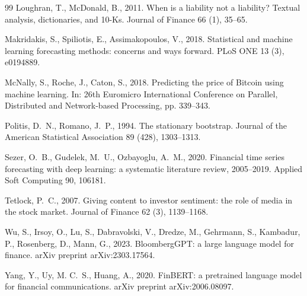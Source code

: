 \documentclass[preprint,12pt,authoryear]{elsarticle}
\begin{document}
\begin{thebibliography}{99}
Loughran, T., McDonald, B., 2011.
When is a liability not a liability? Textual analysis, dictionaries, and 10-Ks.
Journal of Finance 66 (1), 35--65.

Makridakis, S., Spiliotis, E., Assimakopoulos, V., 2018.
Statistical and machine learning forecasting methods: concerns and ways forward.
PLoS ONE 13 (3), e0194889.

McNally, S., Roche, J., Caton, S., 2018.
Predicting the price of Bitcoin using machine learning.
In: 26th Euromicro International Conference on Parallel, Distributed and
Network-based Processing, pp. 339--343.

Politis, D.~N., Romano, J.~P., 1994.
The stationary bootstrap.
Journal of the American Statistical Association 89 (428), 1303--1313.

Sezer, O.~B., Gudelek, M.~U., Ozbayoglu, A.~M., 2020.
Financial time series forecasting with deep learning: a systematic literature
review, 2005--2019.
Applied Soft Computing 90, 106181.

Tetlock, P.~C., 2007.
Giving content to investor sentiment: the role of media in the stock market.
Journal of Finance 62 (3), 1139--1168.

Wu, S., Irsoy, O., Lu, S., Dabravolski, V., Dredze, M., Gehrmann, S., Kambadur,
P., Rosenberg, D., Mann, G., 2023.
BloombergGPT: a large language model for finance.
arXiv preprint arXiv:2303.17564.

Yang, Y., Uy, M. C.~S., Huang, A., 2020.
FinBERT: a pretrained language model for financial communications.
arXiv preprint arXiv:2006.08097.

\end{thebibliography}
\end{document}
